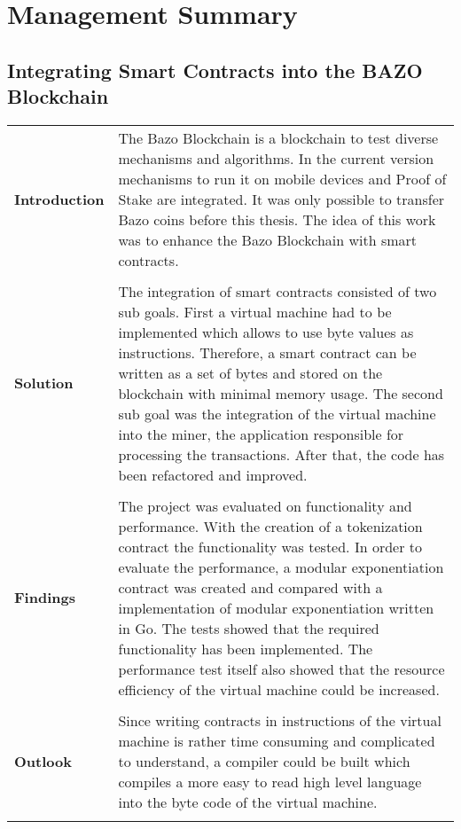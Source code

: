 \chapter*{Management Summary}
\thispagestyle{main} %

\section*{Integrating Smart Contracts into the BAZO Blockchain}

\begin{tabular}[t]{ p{3cm} p{12.5cm}}
\textbf{Introduction} & 
The Bazo Blockchain is a blockchain to test diverse mechanisms and algorithms. In the current version mechanisms to run it on mobile devices and Proof of Stake are integrated. It was only possible to transfer Bazo coins before this thesis. The idea of this work was to enhance the Bazo Blockchain with smart contracts. \\ \\

\raggedright
\textbf{Solution} & 
The integration of smart contracts consisted of two sub goals. First a virtual machine had to be implemented which allows to use byte values as instructions. Therefore, a smart contract can be written as a set of bytes and stored on the blockchain with minimal memory usage. The second sub goal was the integration of the virtual machine into the miner, the application responsible for processing the transactions. After that, the code has been refactored and improved. \\ \\

\raggedright
\textbf{Findings} & 
The project was evaluated on functionality and performance. With the creation of a tokenization contract the functionality was tested. In order to evaluate the performance, a modular exponentiation contract was created and compared with a implementation of modular exponentiation written in Go. The tests showed that the required functionality has been implemented. The performance test itself also showed that the resource efficiency of the virtual machine could be increased. \\ \\

\textbf{Outlook} &
Since writing contracts in instructions of the virtual machine is rather time consuming and complicated to understand, a compiler could be built which compiles a more easy to read high level language into the byte code of the virtual machine.
\\ \\
\end{tabular}
